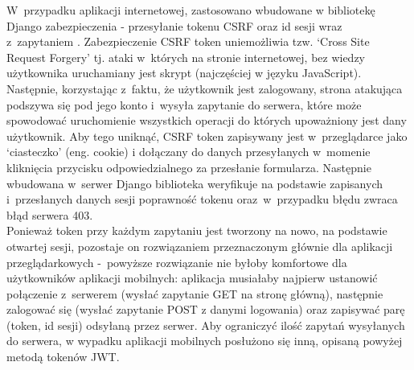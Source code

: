W~przypadku aplikacji internetowej, zastosowano wbudowane w bibliotekę Django zabezpieczenia - przesyłanie tokenu CSRF oraz id sesji wraz z~zapytaniem \cite{djangoCSRF}. Zabezpieczenie CSRF token uniemożliwia tzw. `Cross Site Request Forgery' tj. ataki w~których na stronie internetowej, bez wiedzy użytkownika uruchamiany jest skrypt (najczęściej w języku JavaScript). Następnie, korzystając z~faktu, że użytkownik jest zalogowany, strona atakująca podszywa się pod jego konto i~wysyła zapytanie do serwera, które może spowodować uruchomienie wszystkich operacji do których upoważniony jest dany użytkownik. Aby tego uniknąć, CSRF token zapisywany jest w~przeglądarce jako `ciasteczko' (eng. cookie) i dołączany do danych przesyłanych w~momenie kliknięcia przycisku odpowiedzialnego za przesłanie formularza. Następnie wbudowana w~serwer Django biblioteka weryfikuje na podstawie zapisanych i~przesłanych danych sesji poprawność tokenu oraz~w~przypadku błędu zwraca błąd serwera 403.
\\Ponieważ token przy każdym zapytaniu jest tworzony na nowo, na podstawie otwartej sesji, pozostaje on rozwiązaniem przeznaczonym głównie dla aplikacji przeglądarkowych -~powyższe rozwiązanie nie byłoby komfortowe dla użytkowników aplikacji mobilnych: aplikacja musiałaby najpierw ustanowić połączenie z~serwerem (wysłać zapytanie GET na stronę główną), następnie zalogować się (wysłać zapytanie POST z danymi logowania) oraz zapisywać parę (token, id sesji) odsyłaną przez serwer. Aby ograniczyć ilość zapytań wysyłanych do serwera, w wypadku aplikacji mobilnych posłużono się inną, opisaną powyżej metodą tokenów JWT.
